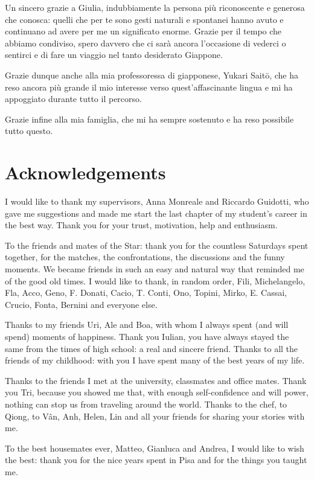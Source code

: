\documentclass[12pt, twoside, a4paper]{report}
\newcommand{\whitepage}{\clearpage
						\thispagestyle{empty}
						\phantom{a}
						\vfill}
\begin{document}
Un sincero grazie a Giulia, indubbiamente la persona più riconoscente e generosa che conosca: quelli che per te sono gesti naturali e spontanei hanno avuto e continuano ad avere per me un significato enorme. Grazie per il tempo che abbiamo condiviso, spero davvero che ci sarà ancora l'occasione di vederci o sentirci e di fare un viaggio nel tanto desiderato Giappone.

Grazie dunque anche alla mia professoressa di giapponese, Yukari Saitō, che ha reso ancora più grande il mio interesse verso quest'affascinante lingua e mi ha appoggiato durante tutto il percorso.

Grazie infine alla mia famiglia, che mi ha sempre sostenuto e ha reso possibile tutto questo.

\whitepage
\newpage

\chapter*{Acknowledgements}
\thispagestyle{empty}

I would like to thank my supervisors, Anna Monreale and Riccardo Guidotti, who gave me suggestions and made me start the last chapter of my student's career in the best way. Thank you for your trust, motivation, help and enthusiasm.

To the friends and mates of the Star: thank you for the countless Saturdays spent together, for the matches, the confrontations, the discussions and the funny moments. We became friends in such an easy and natural way that reminded me of the good old times. I would like to thank, in random order, Fili, Michelangelo, Fla, Acco, Geno, F. Donati, Cacio, T. Conti, Ono, Topini, Mirko, E. Cassai, Crucio, Fonta, Bernini and everyone else.

Thanks to my friends Uri, Ale and Boa, with whom I always spent (and will spend) moments of happiness. Thank you Iulian, you have always stayed the same from the times of high school: a real and sincere friend. Thanks to all the friends of my childhood: with you I have spent many of the best years of my life. 

Thanks to the friends I met at the university, classmates and office mates. Thank you Tri, because you showed me that, with enough self-confidence and will power, nothing can stop us from traveling around the world. Thanks to the chef, to Qiong, to Vân, Anh, Helen, Lin and all your friends for sharing your stories with me.

To the best housemates ever, Matteo, Gianluca and Andrea, I would like to wish the best: thank you for the nice years spent in Pisa and for the things you taught me. 
\end{document}
